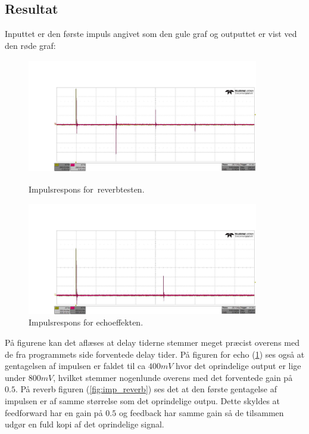 \subsection{Resultat}
Inputtet er den første impuls angivet som den gule graf og outputtet er vist ved den røde graf:
\begin{figure}[!ht]
		\centering
	\begin{minipage}{0.50\textwidth}
		\centering
		\includegraphics[width=0.9\textwidth, height=5cm]{billeder/reverb.png}
		\caption{Impulsrespons for reverbtesten.}
		\label{fig:imp_reverb}
	\end{minipage}\hfill
	\begin{minipage}{0.50\textwidth}
		\centering
		\includegraphics[width=0.9\textwidth, height=5 cm]{billeder/echo.png}
		\caption{Impulsrespons for echoeffekten.}
		\label{fig:imp_echo}
	\end{minipage}
\end{figure}
På figurene kan det aflæses at delay tiderne stemmer meget præcist overens med de fra programmets side forventede delay tider. På figuren for echo (\ref{fig:imp_echo}) ses også at gentagelsen af impulsen er faldet til ca $400\si{mV}$ hvor det oprindelige output er lige under $800\si{mV}$, hvilket stemmer nogenlunde overens med det forventede gain på $0.5$.\newline 
På reverb figuren (\ref{fig:imp_reverb}) ses det at den første gentagelse af impulsen er af samme størrelse som det oprindelige outpu. Dette skyldes at feedforward har en gain på $0.5$ og feedback har samme gain så de tilsammen udgør en fuld kopi af det oprindelige signal. 
